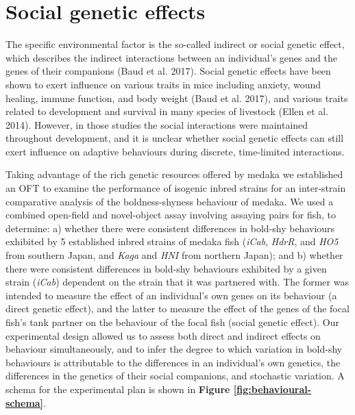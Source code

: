 \documentclass[
]{book}
\begin{document}
\hypertarget{social-genetic-effects}{%
\section{Social genetic effects}\label{social-genetic-effects}}

The specific environmental factor is the so-called indirect or social genetic effect, which describes the indirect interactions between an individual's genes and the genes of their companions (Baud et al. 2017). Social genetic effects have been shown to exert influence on various traits in mice including anxiety, wound healing, immune function, and body weight (Baud et al. 2017), and various traits related to development and survival in many species of livestock (Ellen et al. 2014). However, in those studies the social interactions were maintained throughout development, and it is unclear whether social genetic effects can still exert influence on adaptive behaviours during discrete, time-limited interactions.

Taking advantage of the rich genetic resources offered by medaka we established an OFT to examine the performance of isogenic inbred strains for an inter-strain comparative analysis of the boldness-shyness behaviour of medaka. We used a combined open-field and novel-object assay involving assaying pairs for fish, to determine: a) whether there were consistent differences in bold-shy behaviours exhibited by 5 established inbred strains of medaka fish (\emph{iCab}, \emph{HdrR}, and \emph{HO5} from southern Japan, and \emph{Kaga} and \emph{HNI} from northern Japan); and b) whether there were consistent differences in bold-shy behaviours exhibited by a given strain (\emph{iCab}) dependent on the strain that it was partnered with. The former was intended to measure the effect of an individual's own genes on its behaviour (a direct genetic effect), and the latter to measure the effect of the genes of the focal fish's tank partner on the behaviour of the focal fish (social genetic effect). Our experimental design allowed us to assess both direct and indirect effects on behaviour simultaneously, and to infer the degree to which variation in bold-shy behaviours is attributable to the differences in an individual's own genetics, the differences in the genetics of their social companions, and stochastic variation. A schema for the experimental plan is shown in \textbf{Figure \ref{fig:behavioural-schema}}.
\end{document}
